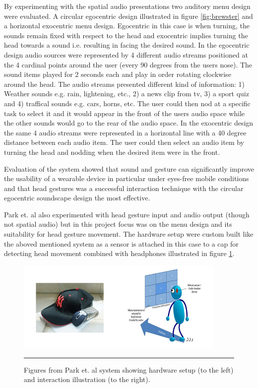 By experimenting with the spatial audio presentations two auditory menu design were evaluated. A circular egocentric design illustrated in figure \ref{fig:brewster} and a horizontal exocentric menu design. Egocentric in this case is when turning, the sounds remain fixed with respect to the head and exocentric implies turning the head towards a sound i.e. resulting in facing the desired sound. In the egocentric design audio sources were represented by 4 different audio streams positioned at the 4 cardinal points around the user (every 90 degrees from the users nose). The sound items played for 2 seconds each and play in order rotating clockwise around the head. The audio streams presented different kind of information: 1) Weather sounds e.g. rain, lightening, etc., 2) a news clip from tv, 3) a sport quiz and 4) traffical sounds e.g. cars, horns, etc. The user could then nod at a specific task to select it and it would appear in the front of the users audio space while the other sounds would go to the rear of the audio space. In the exocentric design the same 4 audio streams were represented in a horizontal line with a 40 degree distance between each audio item. The user could then select an audio item by turning the head and nodding when the desired item were in the front.

Evaluation of the system showed that sound and gesture can significantly improve the usability of a wearable device in particular under eyes-free mobile conditions and that head gestures was a successful interaction technique with the circular egocentric soundscape design the most effective.

Park et. al \cite{park_gaze-directed_2011} also experimented with head gesture input and audio output (though not spatial audio) but in this project focus was on the menu design and its suitability for head gesture movement. The hardware setup were custom built like the aboved mentioned system as a sensor is attached in this case to a cap for detecting head movement combined with headphones illustrated in figure \ref{fig:park}.

\begin{figure}[t]
	\centering
		\includegraphics[width=0.9\textwidth,height=\textheight,keepaspectratio]{./Figures/park-system.png}
		\rule{35em}{0.5pt}
	\caption[Park system]{Figures from Park et. al \cite{park_gaze-directed_2011} system showing hardware setup (to the left) and interaction illustration (to the right).}
	\label{fig:park}
\end{figure}

